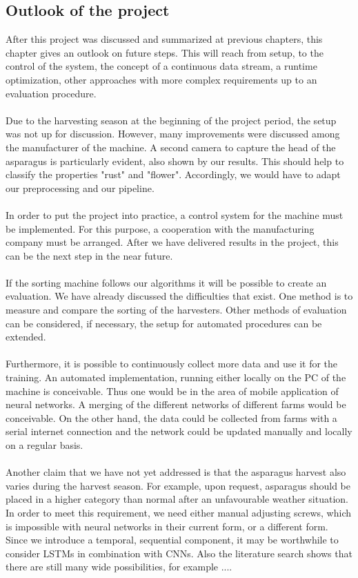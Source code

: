 \subsection{Outlook of the project}

After this project was discussed and summarized at previous chapters, this chapter gives an outlook on future steps. This will reach from  setup, to the control of the system, the concept of a continuous data stream, a runtime optimization, other approaches with more complex requirements up to an evaluation procedure. \\
\\
Due to the harvesting season at the beginning of the project period, the setup was not up for discussion. However, many improvements were discussed among the manufacturer of the machine. A second camera to capture the head of the asparagus is particularly evident, also shown by our results. This should help to classify the properties "rust" and "flower". Accordingly, we would have to adapt our preprocessing and our pipeline. \\
\\
In order to put the project into practice, a control system for the machine must be implemented. For this purpose, a cooperation with the manufacturing company must be arranged. After we have delivered results in the project, this can be the next step in the near future. \\
\\
If the sorting machine follows our algorithms it will be possible to create an evaluation. We have already discussed the difficulties that exist. One method is to measure and compare the sorting of the harvesters. Other methods of evaluation can be considered, if necessary, the setup for automated procedures can be extended. \\
\\
Furthermore, it is possible to continuously collect more data and use it for the training. An automated implementation, running either locally on the PC of the machine is conceivable. Thus one would be in the area of mobile application of neural networks. A merging of the different networks of different farms would be conceivable. On the other hand, the data could be collected from farms with a serial internet connection and the network could be updated manually and locally on a regular basis. \\
\\
Another claim that we have not yet addressed is that the asparagus harvest also varies during the harvest season. For example, upon request, asparagus should be placed in a higher category than normal after an unfavourable weather situation. In order to meet this requirement, we need either manual adjusting screws, which is impossible with neural networks in their current form, or a different form. Since we introduce a temporal, sequential component, it may be worthwhile to consider LSTMs in combination with CNNs. Also the literature search shows that there are still many wide possibilities, for example ....


